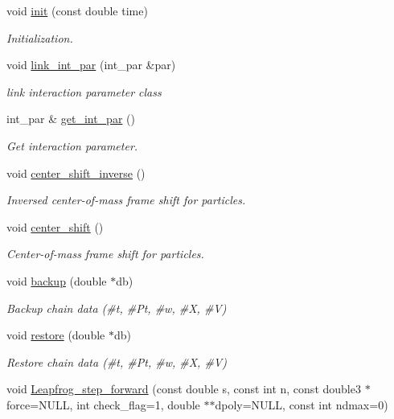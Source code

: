 \begin{DoxyCompactItemize}
void \hyperlink{classARC_1_1chain_a3fe37720ceb48c14905c92d3e25e71a4}{init} (const double time)
\begin{DoxyCompactList}\small\item\em Initialization. \end{DoxyCompactList}\item 
void \hyperlink{classARC_1_1chain_a34cb0bde571c3d8cc8204c3e7c11a821}{link\+\_\+int\+\_\+par} (int\+\_\+par \&par)
\begin{DoxyCompactList}\small\item\em link interaction parameter class \end{DoxyCompactList}\item 
int\+\_\+par \& \hyperlink{classARC_1_1chain_af9bdf54999606c0d6f32843f0d53d8c4}{get\+\_\+int\+\_\+par} ()
\begin{DoxyCompactList}\small\item\em Get interaction parameter. \end{DoxyCompactList}\item 
void \hyperlink{classARC_1_1chain_a7bd0d1b03bcc2e7cdb146960e9d55ea3}{center\+\_\+shift\+\_\+inverse} ()
\begin{DoxyCompactList}\small\item\em Inversed center-\/of-\/mass frame shift for particles. \end{DoxyCompactList}\item 
void \hyperlink{classARC_1_1chain_a73419f14f724668f4858a13c01cf7b70}{center\+\_\+shift} ()
\begin{DoxyCompactList}\small\item\em Center-\/of-\/mass frame shift for particles. \end{DoxyCompactList}\item 
void \hyperlink{classARC_1_1chain_ad098493cd057ac19786f5bc85f9ab25d}{backup} (double $\ast$db)
\begin{DoxyCompactList}\small\item\em Backup chain data (\#t, \#\+Pt, \#w, \#X, \#V) \end{DoxyCompactList}\item 
void \hyperlink{classARC_1_1chain_a5b1bec1324def99667dc6783108d1607}{restore} (double $\ast$db)
\begin{DoxyCompactList}\small\item\em Restore chain data (\#t, \#\+Pt, \#w, \#X, \#V) \end{DoxyCompactList}\item 
void \hyperlink{classARC_1_1chain_aff3cd92c840d1bbbc903a8a07eb079d0}{Leapfrog\+\_\+step\+\_\+forward} (const double s, const int n, const double3 $\ast$force=N\+U\+LL, int check\+\_\+flag=1, double $\ast$$\ast$dpoly=N\+U\+LL, const int ndmax=0)
$$
\end{DoxyCompactItemize}
